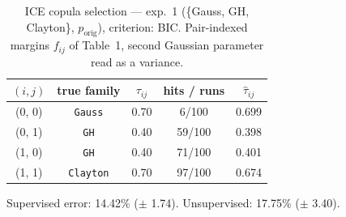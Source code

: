 \begin{table}[htbp]
  \centering
  \caption{ICE copula selection — exp.\ 1 (\{Gauss, GH, Clayton\}, $p_{\text{orig}}$), criterion: BIC. Pair-indexed margins $f_{ij}$ of Table~1, second Gaussian parameter read as a variance.}
  \label{tab:exp3-exp1_orig_p__bic}
  \begin{tabular}{ccccc}
    \toprule
    $(i, j)$ & true family & $\tau_{ij}$ & hits / runs & $\hat\tau_{ij}$ \\
    \midrule
    (0, 0) & \texttt{Gauss} & 0.70 & 6/100 & 0.699 \\
    (0, 1) & \texttt{GH} & 0.40 & 59/100 & 0.398 \\
    (1, 0) & \texttt{GH} & 0.40 & 71/100 & 0.401 \\
    (1, 1) & \texttt{Clayton} & 0.70 & 97/100 & 0.674 \\
    \bottomrule
  \end{tabular}
  \par\smallskip Supervised error: 14.42\% ($\pm$ 1.74). Unsupervised: 17.75\% ($\pm$ 3.40).
\end{table}
